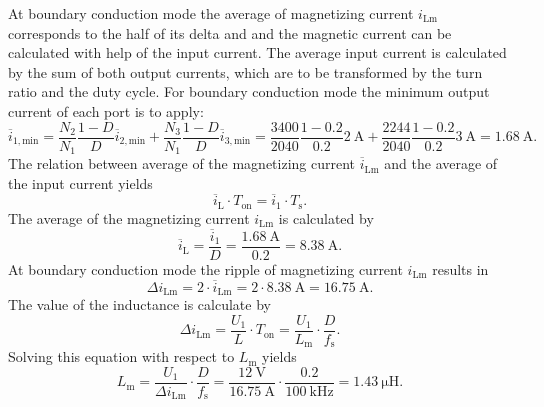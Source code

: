 \begin{solutionblock}
    At boundary conduction mode the average of magnetizing current $i_\mathrm{Lm}$  corresponds to the half of its delta and 
    and the magnetic current can be calculated with help of the input current.
    The average input current is calculated by the sum of both output currents, which are to be transformed by the turn ratio and the duty cycle.
    For boundary conduction mode the minimum output current of each port is to apply:
    \begin{equation*}
        \overline{i}_\mathrm{1,min}=\frac{N_\mathrm{2}}{N_\mathrm{1}} \frac{1-D}{D} \overline{i}_\mathrm{2,min} + \frac{N_\mathrm{3}}{N_\mathrm{1}} \frac{1-D}{D} \overline{i}_\mathrm{3,min}
        = \frac{3400}{2040} \frac{1-0.2}{0.2} \SI{2}{\ampere} + \frac{2244}{2040} \frac{1-0.2}{0.2} \SI{3}{\ampere} = \SI{1.68}{\ampere}.
    \end{equation*}
    The relation between average of the magnetizing current $\overline{i}_\mathrm{Lm}$ and the average of the input current yields
    \begin{equation*}
        \overline{i}_\mathrm{L} \cdot T_\mathrm{on} = \overline{i}_\mathrm{1} \cdot T_\mathrm{s}.
    \end{equation*}
    The average of the magnetizing current $i_\mathrm{Lm}$ is calculated by
    \begin{equation*}
        \overline{i}_\mathrm{L} =  \frac{\overline{i}_\mathrm{1}}{D} =  \frac{\SI{1.68}{\ampere}}{0.2}= \SI{8.38}{\ampere}.
    \end{equation*}
    At boundary conduction mode the ripple of magnetizing current $i_\mathrm{Lm}$  results in
    \begin{equation*}
        \Delta i_\mathrm{Lm} =  2 \cdot \overline{i}_\mathrm{Lm} = 2 \cdot \SI{8.38}{\ampere} = \SI{16.75}{\ampere}.
    \end{equation*}
    The value of the inductance is calculate by
    \begin{equation*}
        \Delta i_\mathrm{Lm}= \frac{U_\mathrm{1}}{L} \cdot T_\mathrm{on} = \frac{U_\mathrm{1}}{L_\mathrm{m}} \cdot \frac{D}{f_\mathrm{s}}  .
    \end{equation*}
    Solving this equation with respect to $L_\mathrm{m}$ yields
    \begin{equation*}
        L_\mathrm{m}= \frac{U_\mathrm{1}}{\Delta i_\mathrm{Lm}} \cdot \frac{D}{f_\mathrm{s}} = \frac{\SI{12}{\volt}}{\SI{16.75}{\ampere}} \cdot \frac{0.2}{\SI{100}{\kilo\hertz}} = \SI{1.43}{\micro\henry}.
    \end{equation*}
\end{solutionblock}

